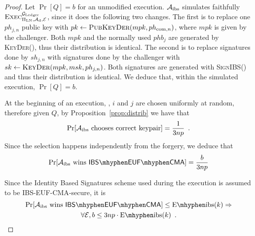   \begin{proof}
    Let $\Pr[Q] = b$ for an unmodified execution. $\mathcal{A}_{\mathrm{ibs}}$
    simulates faithfully $\textsc{Exec}^{\mathcal{G}_{\mathrm{Ledger}}}_{\Pi_{\mathrm{LN}},
    \mathcal{A}_{\mathrm{d}}, \mathcal{E}}$, since it does the following two
    changes. The first is to replace one $ph_{j, n}$ public key with $pk \gets
    \textsc{PubKeyDer}(mpk, ph_{\mathrm{com}, n})$, where $mpk$ is given by the
    challenger. Both $mpk$ and the normally used $phb_j$ are generated by
    \textsc{KeyDer}(), thus their distribution is identical. The second is to
    replace signatures done by $sh_{j, n}$ with signatures done by the
    challenger with $sk \gets \textsc{KeyDer}(mpk, msk, ph_{j, n})$. Both
    signatures are generated with \textsc{SignIBS}() and thus their distribution
    is identical. We deduce that, within the simulated execution, $\Pr[Q] = b$.

    At the beginning of an execution, \alice, $i$ and $j$ are chosen uniformly
    at random, therefore given $Q$, by Proposition~\ref{prop:distrib} we have
    that
    \begin{equation*}
      \Pr[\mathcal{A}_{\mathrm{ibs}} \text{ chooses correct keypair}] =
      \frac{1}{3np} \enspace.
    \end{equation*}
    Since the selection happens independently from the forgery, we deduce that
    \begin{equation*}
      \Pr[\adversary_{\mathrm{ibs}} \text{ wins } \mathsf{IBS \mhyphen EUF
      \mhyphen CMA}] = \frac{b}{3np}
    \end{equation*}

    Since the Identity Based Signatures scheme used during the execution is
    assumed to be \textsf{IBS-EUF-CMA}-secure, it is
    \begin{gather*}
      \Pr[\adversary_{\mathrm{ibs}} \text{ wins } \mathsf{IBS \mhyphen EUF
      \mhyphen CMA}] \leq \mathrm{E \mhyphen ibs}(k) \Rightarrow \\ \forall
      \environment, b \leq 3np \cdot \mathrm{E \mhyphen ibs}(k) \enspace.
    \end{gather*}
  \end{proof}

